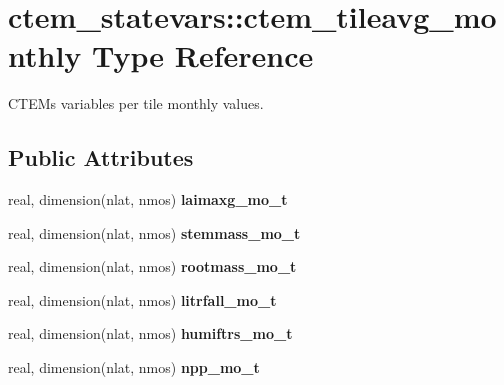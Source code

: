 \hypertarget{structctem__statevars_1_1ctem__tileavg__monthly}{}\section{ctem\+\_\+statevars\+:\+:ctem\+\_\+tileavg\+\_\+monthly Type Reference}
\label{structctem__statevars_1_1ctem__tileavg__monthly}


C\+T\+E\+M\textquotesingle{}s variables per tile monthly values.  


\subsection*{Public Attributes}
\begin{DoxyCompactItemize}
\item 
\hypertarget{structctem__statevars_1_1ctem__tileavg__monthly_a4f9f6c290a5d4d827135532adcb0fa5c}{}real, dimension(nlat, nmos) {\bfseries laimaxg\+\_\+mo\+\_\+t}\label{structctem__statevars_1_1ctem__tileavg__monthly_a4f9f6c290a5d4d827135532adcb0fa5c}

\item 
\hypertarget{structctem__statevars_1_1ctem__tileavg__monthly_a7d214b11d7db4d866a781108f3475bb3}{}real, dimension(nlat, nmos) {\bfseries stemmass\+\_\+mo\+\_\+t}\label{structctem__statevars_1_1ctem__tileavg__monthly_a7d214b11d7db4d866a781108f3475bb3}

\item 
\hypertarget{structctem__statevars_1_1ctem__tileavg__monthly_a771ba23a77e8ea7c3614a334c1fef07c}{}real, dimension(nlat, nmos) {\bfseries rootmass\+\_\+mo\+\_\+t}\label{structctem__statevars_1_1ctem__tileavg__monthly_a771ba23a77e8ea7c3614a334c1fef07c}

\item 
\hypertarget{structctem__statevars_1_1ctem__tileavg__monthly_a87423f5db22d9b5bfa87db0856ce12c2}{}real, dimension(nlat, nmos) {\bfseries litrfall\+\_\+mo\+\_\+t}\label{structctem__statevars_1_1ctem__tileavg__monthly_a87423f5db22d9b5bfa87db0856ce12c2}

\item 
\hypertarget{structctem__statevars_1_1ctem__tileavg__monthly_ab159e6a69ba64b05d6474dcefe8e56f8}{}real, dimension(nlat, nmos) {\bfseries humiftrs\+\_\+mo\+\_\+t}\label{structctem__statevars_1_1ctem__tileavg__monthly_ab159e6a69ba64b05d6474dcefe8e56f8}

\item 
\hypertarget{structctem__statevars_1_1ctem__tileavg__monthly_afd2ea088c16725dedf4287d6c13dfd32}{}real, dimension(nlat, nmos) {\bfseries npp\+\_\+mo\+\_\+t}\label{structctem__statevars_1_1ctem__tileavg__monthly_afd2ea088c16725dedf4287d6c13dfd32}


\end{DoxyCompactItemize}
